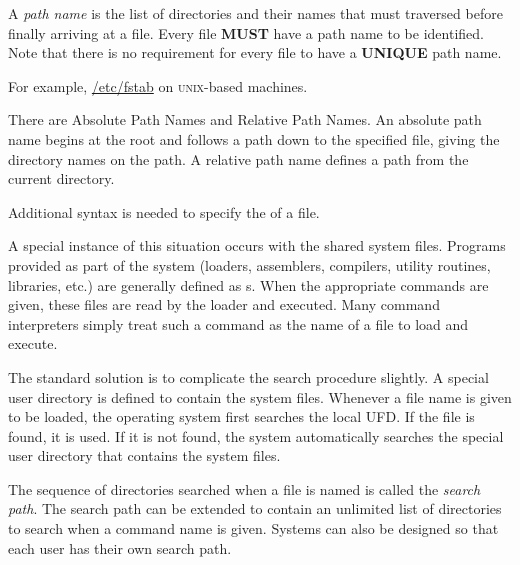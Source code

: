\begin{definition}\label{def:Path_Name}
  A \emph{path name} is the list of directories and their names that must traversed before finally arriving at a file.
  Every file \textbf{MUST} have a path name to be identified.
  Note that there is no requirement for every file to have a \textbf{UNIQUE} path name.

  For example, \url{/etc/fstab} on \textsc{unix}-based machines.

  There are Absolute Path Names and Relative Path Names.
  An absolute path name begins at the root and follows a path down to the specified file, giving the directory names on the path.
  A relative path name defines a path from the current directory.

  \begin{remark}
    Additional syntax is needed to specify the  of a file.
  \end{remark}
\end{definition}

A special instance of this situation occurs with the shared system files.
Programs provided as part of the system (loaders, assemblers, compilers, utility routines, libraries, etc.) are generally defined as s.
When the appropriate commands are given, these files are read by the loader and executed.
Many command interpreters simply treat such a command as the name of a file to load and execute.

The standard solution is to complicate the search procedure slightly.
A special user directory is defined to contain the system files.
Whenever a file name is given to be loaded, the operating system first searches the local UFD.\@
If the file is found, it is used.
If it is not found, the system automatically searches the special user directory that contains the system files.

\begin{definition}\label{def:Search_Path}
  The sequence of directories searched when a file is named is called the \emph{search path}.
  The search path can be extended to contain an unlimited list of directories to search when a command name is given.
  Systems can also be designed so that each user has their own search path.
\end{definition}


